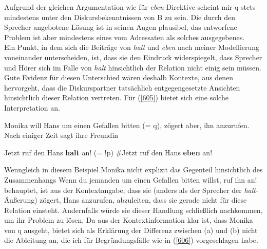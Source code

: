 Aufgrund der gleichen Argumentation wie für \textit{eben}-Direktive scheint mir q stets mindestens unter den Diskursbekenntnissen von B zu sein. Die durch den Sprecher angebotene Lösung ist in seinen Augen plausibel, das entworfene Problem ist aber mindestens eines vom Adressaten als solches ausgegebenes.\\

\noindent
Ein Punkt, in dem sich die Beiträge von \textit{halt} und \textit{eben} nach meiner Modellierung voneinander unterscheiden, ist, dass sie den Eindruck widerspiegelt, dass Sprecher und Hörer sich im Falle von \textit{halt} hinsichtlich der Relation nicht einig sein müssen. Gute Evidenz für diesen Unterschied wären deshalb Kontexte, aus denen hervorgeht, dass die Diskurspartner tatsächlich entgegengesetzte Ansichten hinsichtlich dieser Relation vertreten. Für (\ref{605}) bietet sich eine solche Interpretation an.

\begin{exe}
	\ex\label{605} Monika will Hans um einen Gefallen bitten (= q), zögert aber, ihn anzurufen. Nach einiger Zeit sagt ihre 			Freundin
		\begin{xlist}	
			\ex\label{605a} Jetzt ruf den Hans \textbf{halt} an! (= !p)
			\ex\label{605b} \#Jetzt ruf den Hans \textbf{eben} an!
		\end{xlist}
\end{exe}
Wenngleich in diesem Beispiel Monika nicht explizit das Gegenteil hinsichtlich des Zusammenhangs \glq Wenn du jemanden um einen Gefallen bitten willst, ruf ihn an!\grq {} behauptet, ist aus der Kontextangabe, dass sie (anders als der Sprecher der \textit{halt}-Äußerung) zögert, Hans anzurufen, abzuleiten, dass sie gerade nicht für diese Relation einsteht. Andernfalls würde sie dieser Handlung schließlich nachkommen, um ihr Problem zu lösen. Da aus der Kontextinformation klar ist, dass Monika von q ausgeht, bietet sich als Erklärung der Differenz zwi\-schen (a) und (b) nicht die Ableitung an, die ich für Begründungsfälle wie in (\ref{606}) vorgeschlagen habe.

